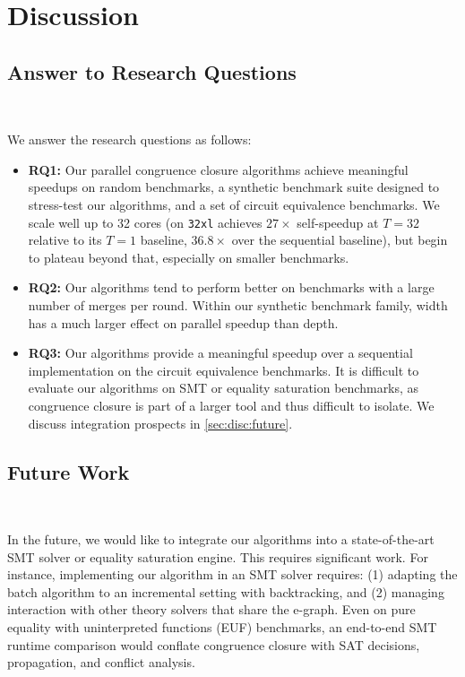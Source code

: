 \section{Discussion}
\label{sec:discussion}

\subsection{Answer to Research Questions}~\label{sec:disc:rq}

We answer the research questions as follows:

\begin{itemize}
  \item \textbf{RQ1:} Our parallel congruence closure algorithms achieve
  meaningful speedups on random benchmarks, a synthetic benchmark suite designed
  to stress-test our algorithms, and a set of circuit equivalence benchmarks. We
  scale well up to 32 cores (\filteralgo on \texttt{32xl} achieves $27\times$
  self-speedup at $T{=}32$ relative to its $T{=}1$ baseline, $36.8\times$ over
  the sequential baseline), but begin to
  plateau beyond that, especially on smaller benchmarks.
  \item \textbf{RQ2:} Our algorithms tend to perform better on benchmarks with a
  large number of merges per round. Within our synthetic benchmark family, width
  has a much larger effect on parallel speedup than depth.
  \item \textbf{RQ3:} Our algorithms provide a meaningful speedup over a
  sequential implementation on the circuit equivalence benchmarks. It is
  difficult to evaluate our algorithms on SMT or equality saturation benchmarks,
  as congruence closure is part of a larger tool and thus difficult to isolate.
  We discuss integration prospects in \autoref{sec:disc:future}.
\end{itemize}

\subsection{Future Work}~\label{sec:disc:future}

In the future, we would like to integrate our algorithms into a state-of-the-art SMT
solver or equality saturation engine. This requires significant work. For instance,
implementing our algorithm in an SMT solver requires: (1) adapting the batch algorithm
to an incremental setting with backtracking, and (2) managing interaction with other
theory solvers that share the e-graph. Even on pure equality with uninterpreted functions (EUF)
benchmarks, an end-to-end SMT runtime comparison would conflate congruence closure with SAT
decisions, propagation, and conflict analysis.

